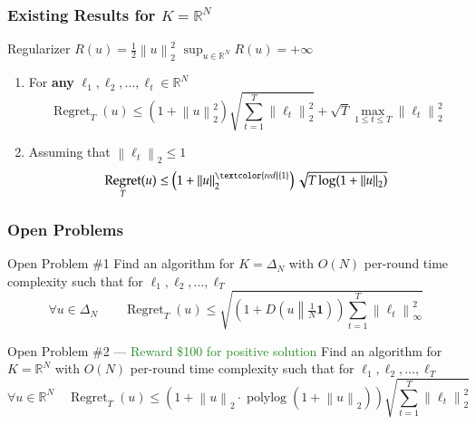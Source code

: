 \documentclass[usenames,dvipsnames]{beamer}
\DeclareMathOperator{\Regret}{Regret}
\DeclareMathOperator{\polylog}{polylog}
\newcommand{\R}{\mathbb{R}}
\newcommand{\indicator}{\mathbf{1}}
\newcommand{\norm}[1]{\left\|#1\right\|}
\newcommand{\KL}[2]{D\left({#1}\middle\|{#2}\right)}
\newcommand{\Cite}[1]{{\tiny \textcolor{Blue}{[#1]}}}
\begin{document}
\begin{frame}
\frametitle{Existing Results for $K=\R^N$}

Regularizer $R(u) = \frac{1}{2}\norm{u}_2^2$ \qquad $\sup_{u \in \R^N} R(u) = +\infty$

\vspace{1cm}

\begin{enumerate}

\item For \textbf{any} $\ell_1, \ell_2, \dots, \ell_t \in \R^N$ \qquad \Cite{OP'15}
$$
\Regret_T(u) \le \left( 1+\norm{u}_2^2 \right) \sqrt{\sum_{t=1}^T \norm{\ell_t}_2^2} + \sqrt{T} \max_{1 \le t \le T} \norm{\ell_t}_2^2
$$

\item Assuming that $\norm{\ell_t}_2 \le 1$ \qquad \Cite{SM'12, O'13, MA'13, MO'14, O'14, OP'16}
$$
\Regret_T(u) \le \left( 1 + \norm{u}_2^{\textcolor{red}{1}} \right) \sqrt{T \log(1+\norm{u}_2)}
$$
\end{enumerate}
\end{frame}

\begin{frame}
\frametitle{Open Problems}

\begin{block}{Open Problem \#1}
Find an algorithm for $K=\Delta_N$ with $O(N)$ per-round time complexity
such that for  $\ell_1, \ell_2, \dots, \ell_T$
$$
\forall u \in \Delta_N \qquad
\Regret_T(u) \le \sqrt{\left(1 + \KL{u}{\tfrac{1}{N}\indicator}\right) \sum_{t=1}^T \norm{\ell_t}_\infty^2}
$$
\end{block}

\begin{block}{Open Problem \#2 --- \textcolor{ForestGreen}{Reward \$100 for positive solution}}
Find an algorithm for $K=\R^N$ with $O(N)$ per-round time complexity
such that for  $\ell_1, \ell_2, \dots, \ell_T$
$$
\forall u \in \R^N \quad
\Regret_T(u) \le (1 + \norm{u}_2 \cdot \polylog(1+\norm{u}_2)) \sqrt{\sum_{t=1}^T \norm{\ell_t}_2^2}
$$
\end{block}
\end{frame}
\end{document}
